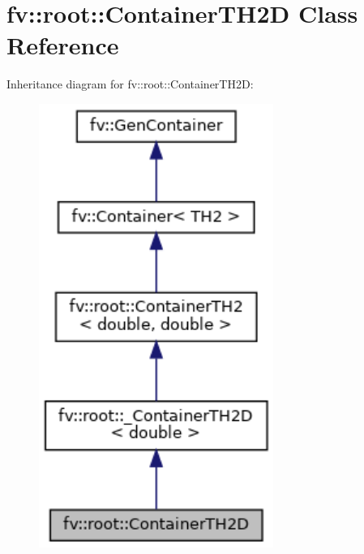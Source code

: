 \hypertarget{classfv_1_1root_1_1ContainerTH2D}{}\section{fv\+:\+:root\+:\+:Container\+T\+H2D Class Reference}
\label{classfv_1_1root_1_1ContainerTH2D}


Inheritance diagram for fv\+:\+:root\+:\+:Container\+T\+H2D\+:
\nopagebreak
\begin{figure}[H]
\begin{center}
\leavevmode
\includegraphics[width=217pt]{classfv_1_1root_1_1ContainerTH2D__inherit__graph}
\end{center}
\end{figure}


